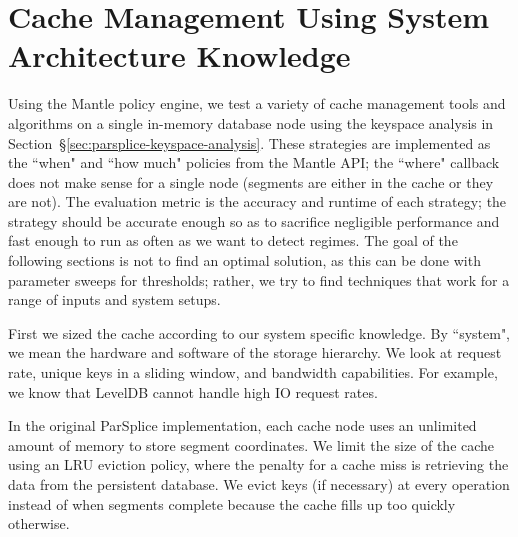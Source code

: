 %
%
%
%

\section{Cache Management Using System Architecture Knowledge}
\label{sec:arch-specific}

Using the Mantle policy engine, we test a variety of cache management tools and
algorithms on a single in-memory database node using the keyspace analysis in
Section~\S\ref{sec:parsplice-keyspace-analysis}. These strategies are
implemented as the ``when" and ``how much" policies from the Mantle API; the
``where" callback does not make sense for a single node (segments are either in
the cache or they are not). The evaluation metric is the accuracy and runtime
of each strategy; the strategy should be accurate enough so as to sacrifice
negligible performance and fast enough to run as often as we want to detect
regimes. The goal of the following sections is not to find an optimal solution,
as this can be done with parameter sweeps for thresholds; rather, we try to
find techniques that work for a range of inputs and system setups.

First we sized the cache according to our system specific knowledge. By
``system", we mean the hardware and software of the storage hierarchy. We look
at request rate, unique keys in a sliding window, and bandwidth capabilities. For
example, we know that LevelDB cannot handle high IO request rates.

In the original ParSplice implementation, each cache node uses an unlimited
amount of memory to store segment coordinates. We limit the size of the cache
using an LRU eviction policy, where the penalty for a cache miss is retrieving
the data from the persistent database.  We evict keys (if necessary) at every
operation instead of when segments complete because the cache fills up too
quickly otherwise.


